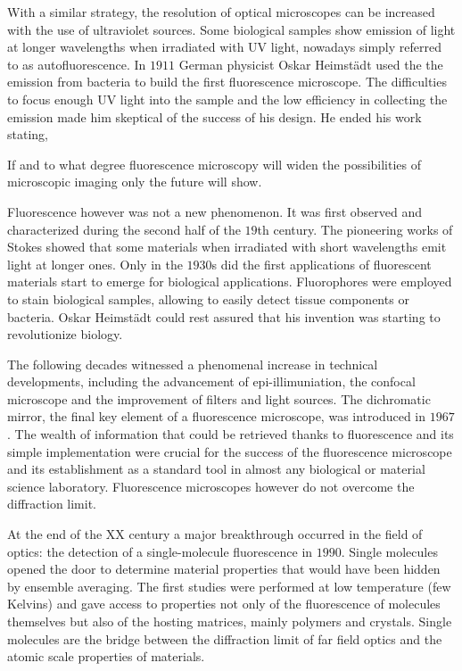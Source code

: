 With a similar strategy, the resolution of optical microscopes can be increased
with the use of ultraviolet sources. Some biological samples show emission of
light at longer wavelengths when irradiated with UV light, nowadays simply
referred to as autofluorescence. In $1911$ German physicist Oskar Heimst\"{a}dt
used the the emission from bacteria to build the first fluorescence
microscope\cite{Heimstadt1911}. The difficulties to focus enough UV light into
the sample and the low efficiency in collecting the emission made him skeptical
of the success of his design. He ended his work stating\cite{Rusk2009},

\begin{displayquote}
If and to what degree fluorescence microscopy will widen the possibilities of
microscopic imaging only the future will show.
\end{displayquote}

Fluorescence however was not a new phenomenon. It was first observed and
characterized during the second half of the $19$th century. The pioneering works
of Stokes showed that some materials when irradiated with short wavelengths emit
light at longer ones. Only in the $1930$s did the first applications of
fluorescent materials start to emerge for biological applications.
Fluorophores were employed to stain biological samples, allowing to easily
detect tissue components or bacteria. Oskar Heimst\"{a}dt could rest assured
that his invention was starting to revolutionize biology. 

The following decades witnessed a phenomenal increase in technical developments,
including the advancement of epi-illimuniation, the confocal microscope and the
improvement of filters and light sources. The dichromatic mirror, the final key
element of a fluorescence microscope, was introduced in $1967$\cite{Ploem1967}.
The wealth of information that could be retrieved thanks to fluorescence and its
simple implementation were crucial for the success of the fluorescence
microscope and its establishment as a standard tool in almost any biological or
material science laboratory. Fluorescence microscopes however do not overcome
the diffraction limit. 

At the end of the XX century a major breakthrough occurred in the field of
optics: the detection of a single-molecule fluorescence in
$1990$\cite{PhysRevLett.65.2716}. Single molecules opened the door to determine
material properties that would have been hidden by ensemble averaging.
The first studies were performed at low temperature (few Kelvins) and gave
access to properties not only of the fluorescence of molecules themselves but
also of the hosting matrices, mainly polymers and crystals. Single molecules are
the bridge between the diffraction limit of far field optics and the atomic
scale properties of materials.

